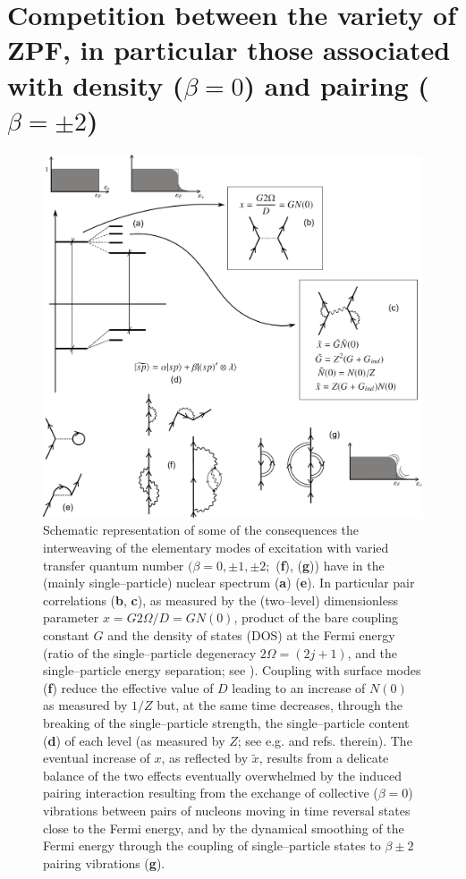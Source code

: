 \section[Competition between ZPF]{Competition between the variety of ZPF, in particular those associated with density ($\beta=0$) and pairing ($\beta=\pm2$)}\label{appintroF}

\begin{figure}
\centerline {
\includegraphics*[width=12cm]{introduccion/figs/figintro6}
}
\caption{Schematic representation of some of the consequences the interweaving of the elementary modes of excitation with varied transfer quantum number $(\beta=0,\pm1,\pm2;$  (\textbf{f}), (\textbf{g})) have in the (mainly single--particle) nuclear spectrum (\textbf{a}) (\textbf{e}). In particular pair correlations (\textbf{b}, \textbf{c}), as measured by the (two--level) dimensionless parameter $x=G2\Omega/D=GN(0)$, product of the bare coupling constant $G$ and the density of states (DOS) at the Fermi energy (ratio of the single--particle degeneracy $2\Omega=(2j+1)$, and the single--particle energy separation; see \cite{Hogassen:61,Broglia:68}). Coupling with surface modes (\textbf{f}) reduce the effective value of $D$ leading to an increase of $N(0)$ as measured by $1/Z$ but, at the same time decreases, through the breaking of the single--particle strength, the single--particle content (\textbf{d}) of each level (as measured by $Z$; see e.g. \cite{Barranco:05} and refs. therein). The eventual increase of $x$, as reflected by $\tilde x$, results from a delicate balance of the two effects eventually overwhelmed by the induced pairing interaction resulting from the exchange of collective ($\beta=0$) vibrations between pairs of nucleons moving in time reversal states close to the Fermi energy, and by the dynamical smoothing of the Fermi energy through the coupling of single--particle states to $\beta\pm2$ pairing vibrations (\textbf{g}).}
\label{figintro6}
\end{figure}
